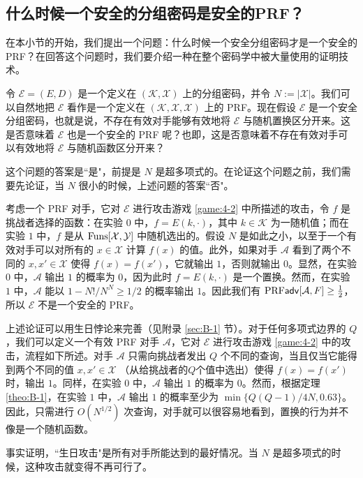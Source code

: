 \subsection{什么时候一个安全的分组密码是安全的PRF？}

在本小节的开始，我们提出一个问题：什么时候一个安全分组密码才是一个安全的 PRF？在回答这个问题时，我们要介绍一种在整个密码学中被大量使用的证明技术。

令 $\mathcal{E}=(E,D)$ 是一个定义在 $(\mathcal{K},\mathcal{X})$ 上的分组密码，并令 $N:=|\mathcal{X}|$。我们可以自然地把 $\mathcal{E}$ 看作是一个定义在 $(\mathcal{K},\mathcal{X},\mathcal{X})$ 上的 PRF。现在假设 $\mathcal{E}$ 是一个安全分组密码，也就是说，不存在有效对手能够有效地将 $\mathcal{E}$ 与随机置换区分开来。这是否意味着 $\mathcal{E}$ 也是一个安全的 PRF 呢？也即，这是否意味着不存在有效对手可以有效地将 $\mathcal{E}$ 与随机函数区分开来？

这个问题的答案是``是"，前提是 $N$ 是超多项式的。在论证这个问题之前，我们需要先论证，当 $N$ 很小的时候，上述问题的答案``否"。

考虑一个 PRF 对手，它对 $\mathcal{E}$ 进行攻击游戏 \ref{game:4-2} 中所描述的攻击，令 $f$ 是挑战者选择的函数：在实验 $0$ 中，$f=E(k,\cdot)$，其中 $k\in\mathcal{K}$ 为一随机值；而在实验 $1$ 中，$f$ 是从 ${\rm Funs}[\mathcal{X},\mathcal{Y}]$ 中随机选出的。假设 $N$ 是如此之小，以至于一个有效对手可以对所有的 $x\in\mathcal{X}$ 计算 $f(x)$ 的值。此外，如果对手 $\mathcal{A}$ 看到了两个不同的 $x,x'\in\mathcal{X}$ 使得 $f(x)=f(x')$，它就输出 $1$，否则就输出 $0$。显然，在实验 $0$ 中，$\mathcal{A}$ 输出 $1$ 的概率为 $0$，因为此时 $f=E(k,\cdot)$ 是一个置换。然而，在实验 $1$ 中，$\mathcal{A}$ 能以 $1-{N!}/{N^N}\geq{1}/{2}$ 的概率输出 $1$。因此我们有 ${\rm PRF\mathsf{adv}}[\mathcal{A}, F]\geq\frac{1}{2}$，所以 $\mathcal{E}$ 不是一个安全的 PRF。

上述论证可以用生日悖论来完善（见附录 \ref{sec:B-1} 节）。对于任何多项式边界的 $Q$，我们可以定义一个有效 PRF 对手 $\mathcal{A}$，它对 $\mathcal{E}$ 进行攻击游戏 \ref{game:4-2} 中的攻击，流程如下所述。对手 $\mathcal{A}$ 只需向挑战者发出 $Q$ 个不同的查询，当且仅当它能得到两个不同的值 $x,x'\in\mathcal{X}$ （从给挑战者的$Q$个值中选出）使得 $f(x)=f(x')$时，输出 $1$。同样，在实验 $0$ 中，$\mathcal{A}$ 输出 $1$ 的概率为 $0$。然而，根据定理 \ref{theo:B-1}，在实验 $1$ 中，$\mathcal{A}$ 输出 $1$ 的概率至少为 $\min\{{Q(Q-1)}/{4N},0.63\}$。因此，只需进行 $O(N^{1/2})$ 次查询，对手就可以很容易地看到，置换的行为并不像是一个随机函数。

事实证明，``生日攻击"是所有对手所能达到的最好情况。当 $N$ 是超多项式的时候，这种攻击就变得不再可行了。

